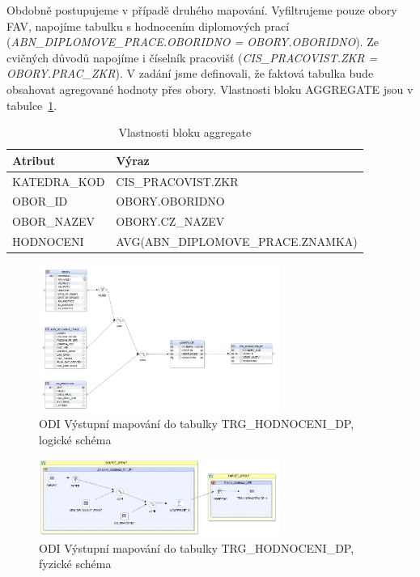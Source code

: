 Obdobně postupujeme v případě druhého mapování.
Vyfiltrujeme pouze obory FAV, napojíme tabulku s hodnocením diplomových prací (\textit{ABN\_DIPLOMOVE\_PRACE.OBORIDNO = OBORY.OBORIDNO}).
Ze cvičných důvodů napojíme i číselník pracovišť (\textit{CIS\_PRACOVIST.ZKR = OBORY.PRAC\_ZKR}).
V zadání jsme definovali, že faktová tabulka bude obsahovat agregované hodnoty přes obory.
Vlastnosti bloku AGGREGATE jsou v tabulce~\ref{table:table4}.

\begin{table}[htb]
    \centering

    \begin{tabular}{ll}
        \toprule

        Atribut         & Výraz                             \\ \midrule
        KATEDRA\_KOD    & CIS\_PRACOVIST.ZKR                \\
        OBOR\_ID        & OBORY.OBORIDNO                    \\
        OBOR\_NAZEV     & OBORY.CZ\_NAZEV                   \\
        HODNOCENI       & AVG(ABN\_DIPLOMOVE\_PRACE.ZNAMKA) \\
          
        \bottomrule
    \end{tabular}

    \caption{Vlastnosti bloku aggregate}
    \label{table:table4}
\end{table}
\FloatBarrier

\begin{figure}[htb]
    \centering
    \includegraphics[width=0.7\textwidth]{graphs/odi-mapping-trg-hodnoceni-dp.png}
    \caption{ODI Výstupní mapování do tabulky TRG\_HODNOCENI\_DP, logické schéma}
    \label{fig:odi-mapping-trg-hodnoceni}
\end{figure}
\FloatBarrier

\begin{figure}[htb]
    \centering
    \includegraphics[width=0.7\textwidth]{graphs/odi-mapping-trg-hodnoceni-dp-physical.png}
    \caption{ODI Výstupní mapování do tabulky TRG\_HODNOCENI\_DP, fyzické schéma}
    \label{fig:odi-mapping-trg-hodnoceni-physical}
\end{figure}
\FloatBarrier


